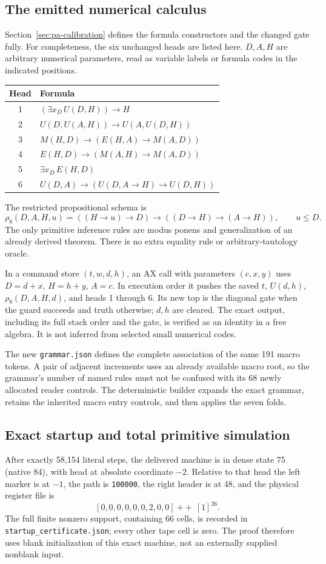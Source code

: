 \documentclass[11pt,letterpaper]{article}
\newcommand{\file}[1]{\texttt{\nolinkurl{#1}}}
\newcommand{\code}[1]{\texttt{#1}}
\begin{document}
\subsection{The emitted numerical calculus}
Section~\ref{sec:pa-calibration} defines the formula constructors and
the changed gate fully. For completeness, the six unchanged heads are
listed here. \(D,A,H\) are arbitrary numerical parameters, read as
variable labels or formula codes in the indicated positions.
\begin{center}\small
\begin{tabular}{@{}cl@{}}
\toprule
Head & Formula\\
\midrule
1 & \((\exists x_D\,U(D,H))\to H\)\\
2 & \(U(D,U(A,H))\to U(A,U(D,H))\)\\
3 & \(M(H,D)\to(E(H,A)\to M(A,D))\)\\
4 & \(E(H,D)\to(M(A,H)\to M(A,D))\)\\
5 & \(\exists x_D\,E(H,D)\)\\
6 & \(U(D,A)\to(U(D,A\to H)\to U(D,H))\)\\
\bottomrule
\end{tabular}
\end{center}
The restricted propositional schema is
\[
 \rho_8(D,A,H,u)=((H\to u)\to D)\to((D\to H)\to(A\to H)),
 \qquad u\le D.
\]
The only primitive inference rules are modus ponens and generalization
of an already derived theorem. There is no extra equality rule or
arbitrary-tautology oracle.

In a command store \((t,w,d,h)\), an AX call with parameters \((c,x,y)\)
uses \(D=d+x\), \(H=h+y\), \(A=c\). In execution order it pushes
the saved \(t\), \(U(d,h)\), \(\rho_8(D,A,H,d)\), and heads 1 through 6.
Its new top is the diagonal gate when the guard succeeds and truth
otherwise; \(d,h\) are cleared. The exact output, including its full
stack order and the gate, is verified as an identity in a free algebra.
It is not inferred from selected small numerical codes.

The new \file{grammar.json} defines the complete association of the same
191 macro tokens. A pair of adjacent increments uses an already
available macro root, so the grammar's number of named rules must not
be confused with its 68 newly allocated reader controls. The deterministic
builder expands the exact grammar, retains the inherited macro entry
controls, and then applies the seven folds.

\subsection{Exact startup and total primitive simulation}
After exactly 58,154 literal steps, the delivered machine is in dense
state 75 (native 84), with head at absolute coordinate \(-2\).
Relative to that head the left marker is at \(-1\), the path is
\code{100000}, the right header is at 48, and the physical register
file is
\[
 [0,0,0,0,0,0,2,0,0]\ \mathbin{+\!\!+}\ [1]^{26}.
\]
The full finite nonzero support, containing 66 cells, is recorded in
\file{startup_certificate.json}; every other tape cell is zero.
The proof therefore uses blank initialization of this exact machine,
not an externally supplied nonblank input.
\end{document}
